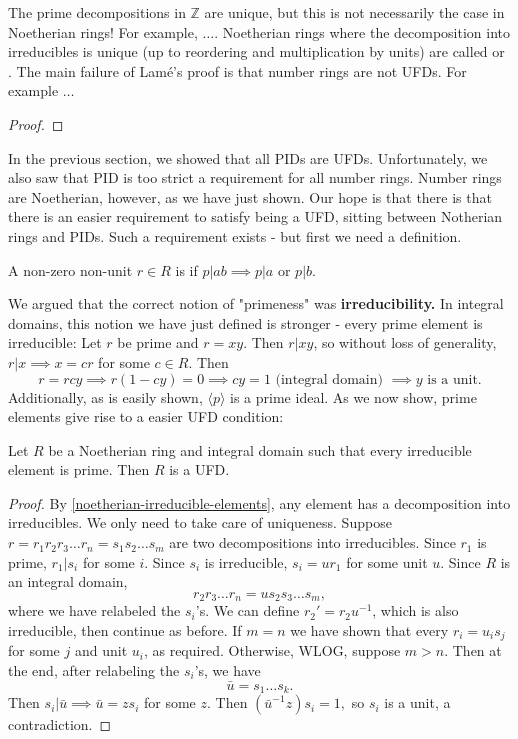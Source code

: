 \begin{remark}
The prime decompositions in $\mathbb{Z}$ are unique, but this is not necessarily the case in Noetherian rings! For example, $\dots$. Noetherian rings where the decomposition into irreducibles is unique (up to reordering and multiplication by units) are called  or . The main failure of Lamé's proof is that number rings are not UFDs. For example $\dots$
\end{remark}

\begin{proof}

\end{proof}

In the previous section, we showed that all PIDs are UFDs. Unfortunately, we also saw that PID is too strict a requirement for all number rings. Number rings are Noetherian, however, as we have just shown. Our hope is that there is that there is an easier requirement to satisfy being a UFD, sitting between Notherian rings and PIDs. Such a requirement exists - but first we need a definition.

\begin{definition}
A non-zero non-unit $r\in R$ is  if $p|ab\implies p|a$ or $p|b$.
\end{definition}

We argued that the correct notion of "primeness" was \textbf{irreducibility.} In integral domains, this notion we have just defined is stronger - every prime element is irreducible: Let $r$ be prime and $r=xy$. Then $r|xy$, so without loss of generality, $r|x\implies x=cr$ for some $c\in R$. Then $$r=rcy\implies r(1-cy)=0\implies cy=1 \text{ (integral domain) }\implies y \text{ is a unit.}$$ Additionally, as is easily shown, $\langle p \rangle$ is a prime ideal. As we now show, prime elements give rise to a easier UFD condition:

\begin{proposition}\label{Noetherian-prime-UFD}
Let $R$ be a Noetherian ring and integral domain such that every irreducible element is prime. Then $R$ is a UFD.
\end{proposition}
\begin{proof}
By \cref{noetherian-irreducible-elements}, any element has a decomposition into irreducibles. We only need to take care of uniqueness. Suppose $r=r_1r_2r_3\dots r_n=s_1s_2\dots s_m$ are two decompositions into irreducibles. Since $r_1$ is prime, $r_1|s_i$ for some $i$. Since $s_i$ is irreducible, $s_i=ur_1$ for some unit $u$. Since $R$ is an integral domain, $$r_2r_3\dots r_n=us_2s_3\dots s_m,$$ where we have relabeled the $s_i$'s. We can define $r_2'=r_2u^{-1}$, which is also irreducible, then continue as before. If $m=n$ we have shown that every $r_i=u_is_j$ for some $j$ and unit $u_i$, as required. Otherwise, WLOG, suppose $m>n$. Then at the end, after relabeling the $s_i$'s, we have
$$\bar u= s_1\dots s_k.$$ Then $s_i|\bar{u}\implies \bar{u}=zs_i$ for some $z$. Then $(\bar{u}^{-1}z)s_i=1,$ so $s_i$ is a unit, a contradiction.
\end{proof}


